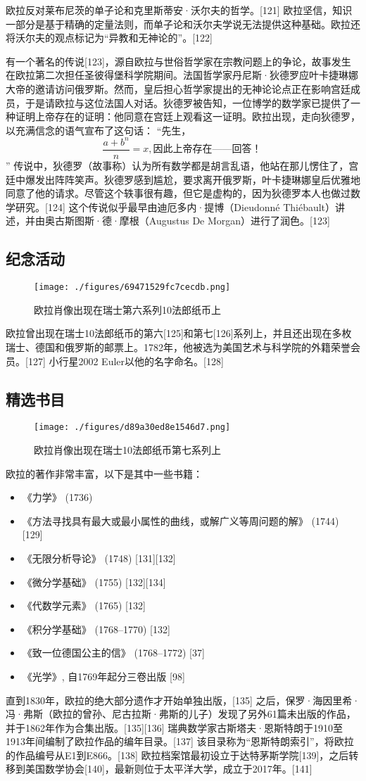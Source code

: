 欧拉反对莱布尼茨的单子论和克里斯蒂安·沃尔夫的哲学。[121] 欧拉坚信，知识一部分是基于精确的定量法则，而单子论和沃尔夫学说无法提供这种基础。欧拉还将沃尔夫的观点标记为“异教和无神论的”。[122]  

有一个著名的传说[123]，源自欧拉与世俗哲学家在宗教问题上的争论，故事发生在欧拉第二次担任圣彼得堡科学院期间。法国哲学家丹尼斯·狄德罗应叶卡捷琳娜大帝的邀请访问俄罗斯。然而，皇后担心哲学家提出的无神论论点正在影响宫廷成员，于是请欧拉与这位法国人对话。狄德罗被告知，一位博学的数学家已提供了一种证明上帝存在的证明：他同意在宫廷上观看这一证明。欧拉出现，走向狄德罗，以充满信念的语气宣布了这句话：
“先生，  
\[
\frac{a+b^n}{n} = x, \text{因此上帝存在——回答！}~
\]”
传说中，狄德罗（故事称）认为所有数学都是胡言乱语，他站在那儿愣住了，宫廷中爆发出阵阵笑声。狄德罗感到尴尬，要求离开俄罗斯，叶卡捷琳娜皇后优雅地同意了他的请求。尽管这个轶事很有趣，但它是虚构的，因为狄德罗本人也做过数学研究。[124] 这个传说似乎最早由迪厄多内·提博（Dieudonné Thiébault）讲述，并由奥古斯图斯·德·摩根（Augustus De Morgan）进行了润色。[123]
\subsection{纪念活动}
\begin{figure}[ht]
\centering
\texttt{[image: ./figures/69471529fc7cecdb.png]}
\caption{欧拉肖像出现在瑞士第六系列10法郎纸币上} \label{fig_OL1_6}
\end{figure}
欧拉曾出现在瑞士10法郎纸币的第六[125]和第七[126]系列上，并且还出现在多枚瑞士、德国和俄罗斯的邮票上。1782年，他被选为美国艺术与科学院的外籍荣誉会员。[127] 小行星2002 Euler以他的名字命名。[128]
\subsection{精选书目}
\begin{figure}[ht]
\centering
\texttt{[image: ./figures/d89a30ed8e1546d7.png]}
\caption{欧拉肖像出现在瑞士10法郎纸币第七系列上} \label{fig_OL1_7}
\end{figure}
欧拉的著作非常丰富，以下是其中一些书籍：
\begin{itemize}
\item 《力学》 (1736)
\item 《方法寻找具有最大或最小属性的曲线，或解广义等周问题的解》 (1744) [129]
\item 《无限分析导论》 (1748) [131][132]
\item 《微分学基础》 (1755) [132][134]
\item 《代数学元素》 (1765) [132]
\item 《积分学基础》 (1768–1770) [132]
\item 《致一位德国公主的信》 (1768–1772) [37]
\item 《光学》, 自1769年起分三卷出版 [98]
\end{itemize}
直到1830年，欧拉的绝大部分遗作才开始单独出版，[135] 之后，保罗·海因里希·冯·弗斯（欧拉的曾孙、尼古拉斯·弗斯的儿子）发现了另外61篇未出版的作品，并于1862年作为合集出版。[135][136] 瑞典数学家古斯塔夫·恩斯特朗于1910至1913年间编制了欧拉作品的编年目录。[137] 该目录称为“恩斯特朗索引”，将欧拉的作品编号从E1到E866。[138] 欧拉档案馆最初设立于达特茅斯学院[139]，之后转移到美国数学协会[140]，最新则位于太平洋大学，成立于2017年。[141]


